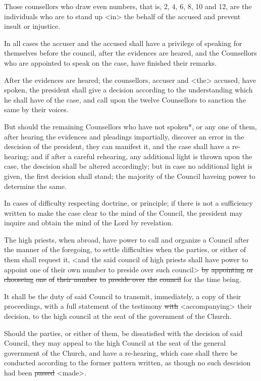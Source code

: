 					Those counsellors who draw even numbers, that is, 2, 4, 6, 8, 10 and 12, are the individuals who are to stand up <in> the behalf of the accused and prevent insult or injustice.

					In all cases the accuser and the accused shall have a privilege of speaking for themselves before the council, after the evidences are heared, and the Counsellors who are appointed to speak on the case, have finished their remarks.

					After the evidences are heared; the counsellors, accuser and <the> accused, have spoken, the president shall give a decision according to the understanding which he shall have of the case, and call upon the twelve Counsellors to sanction the same by their voices.

					But should the remaining Counsellors who have not spoken*, or any one of them, after hearing the evidences and pleadings impartially, discover an error in the descision of the president, they can manifest it, and the case shall have a re-hearing; and if after a careful rehearing, any additional light is thrown upon the case, the descision shall be altered accordingly; but in case no additional light is given, the first decision shall stand; the majority of the Council haveing power to determine the same.

					In cases of difficulty respecting doctrine, or principle; if there is not a sufficiency written to make the case clear to the mind of the Council, the president may inquire and obtain the mind of the Lord by revelation.

					The high priests, when abroad, have power to call and organize a Council after the manner of the foregoing, to settle difficulties when the parties, or either of them shall request it, <and the said council of high priests shall have power to appoint one of their own number to preside over such council> \sout{by} \sout{appointing} \sout{or chooseing} \sout{one} \sout{of} \sout{their number} \sout{to} \sout{preside over} \sout{the} \sout{council} for the time being.

					It shall be the duty of said Council to transmit, immediately, a copy of their proceedings, with a full statement of the testimony \sout{with} <accompanying> their decision, to the high council at the seat of the government of the Church.

					Should the parties, or either of them, be dissatisfied with the decision of said Council, they may appeal to the high Council at the seat of the general government of the Church, and have a re-hearing, which case shall there be conducted according to the former pattern written, as though no such descision had been \sout{passed} <made>.

